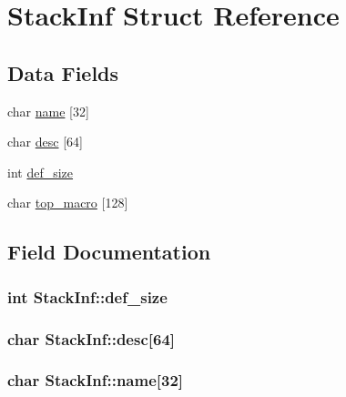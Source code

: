 \hypertarget{structStackInf}{}\section{Stack\+Inf Struct Reference}
\label{structStackInf}
\subsection*{Data Fields}
\begin{DoxyCompactItemize}
\item 
char \hyperlink{structStackInf_a9f47cfd7dc989579d8e449ac821130ce}{name} \mbox{[}32\mbox{]}
\item 
char \hyperlink{structStackInf_a6719b7ffffaa34f3a5c973e06369e9b3}{desc} \mbox{[}64\mbox{]}
\item 
int \hyperlink{structStackInf_a58879eae3bfda4bb51d864f58ba32b8f}{def\+\_\+size}
\item 
char \hyperlink{structStackInf_aecd772924d9909d2875259c5aedc5bc9}{top\+\_\+macro} \mbox{[}128\mbox{]}
\end{DoxyCompactItemize}


\subsection{Field Documentation}
\subsubsection[{\texorpdfstring{def\+\_\+size}{def_size}}]{\setlength{\rightskip}{0pt plus 5cm}int Stack\+Inf\+::def\+\_\+size}\hypertarget{structStackInf_a58879eae3bfda4bb51d864f58ba32b8f}{}\label{structStackInf_a58879eae3bfda4bb51d864f58ba32b8f}
\subsubsection[{\texorpdfstring{desc}{desc}}]{\setlength{\rightskip}{0pt plus 5cm}char Stack\+Inf\+::desc\mbox{[}64\mbox{]}}\hypertarget{structStackInf_a6719b7ffffaa34f3a5c973e06369e9b3}{}\label{structStackInf_a6719b7ffffaa34f3a5c973e06369e9b3}
\subsubsection[{\texorpdfstring{name}{name}}]{\setlength{\rightskip}{0pt plus 5cm}char Stack\+Inf\+::name\mbox{[}32\mbox{]}}\hypertarget{structStackInf_a9f47cfd7dc989579d8e449ac821130ce}{}\label{structStackInf_a9f47cfd7dc989579d8e449ac821130ce}
